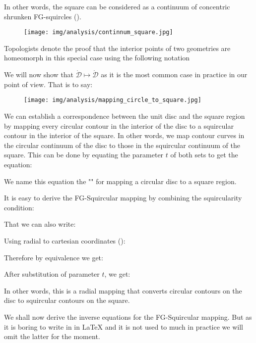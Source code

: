 	In other words, the square can be considered as a continuum of concentric shrunken FG-squircles ().
	\begin{figure}[H]
		\centering
		\texttt{[image: img/analysis/continnum\_square.jpg]}
	\end{figure}

	Topologists denote the proof that the interior points of two geometries are homeomorph in this special case using the following notation
	
	We will now show that $\mathring{\mathcal{D}}\mapsto \mathring{\mathcal{D}}$ as it is the most common case in practice in our point of view. That is to say:
	\begin{figure}[H]
		\centering
		\texttt{[image: img/analysis/mapping\_circle\_to\_square.jpg]}
	\end{figure}
	We can establish a correspondence between the unit disc and the square region by mapping every circular contour in the interior of the disc to a squircular contour in the interior of the square. In other words, we map contour curves in the circular continuum of the disc to those in the squircular continuum of the square. This can be done by equating the parameter $t$ of both sets to get the equation:
	
	We name this equation the "" for mapping a circular disc to a square region.
	
	It is easy to derive the FG-Squircular mapping by combining the squircularity condition:
	
	That we can also write:
	
	Using radial to cartesian coordinates ():
	
	Therefore by equivalence we get:
	
	After substitution of parameter $t$, we get:
	

	In other words, this is a radial mapping that converts circular contours on the disc to squircular contours on the square.
	
	We shall now derive the inverse equations for the FG-Squircular mapping. But as it is boring to write in in \LaTeX{} and it is not used to much in practice we will omit the latter for the moment.
	
